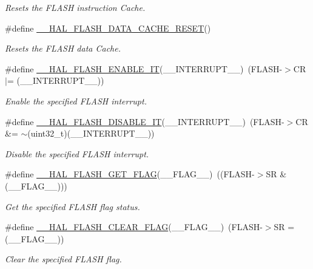 \begin{DoxyCompactItemize}
\begin{DoxyCompactList}\small\item\em Resets the F\+L\+A\+SH instruction Cache. \end{DoxyCompactList}\item 
\#define \hyperlink{group___f_l_a_s_h___exported___macros_ga3b94f4f103ddab361802c8defd3a9c34}{\+\_\+\+\_\+\+H\+A\+L\+\_\+\+F\+L\+A\+S\+H\+\_\+\+D\+A\+T\+A\+\_\+\+C\+A\+C\+H\+E\+\_\+\+R\+E\+S\+ET}()
\begin{DoxyCompactList}\small\item\em Resets the F\+L\+A\+SH data Cache. \end{DoxyCompactList}\item 
\#define \hyperlink{group___f_l_a_s_h___exported___macros_ga13fa137a911f02a2f94fb9fb0762a340}{\+\_\+\+\_\+\+H\+A\+L\+\_\+\+F\+L\+A\+S\+H\+\_\+\+E\+N\+A\+B\+L\+E\+\_\+\+IT}(\+\_\+\+\_\+\+I\+N\+T\+E\+R\+R\+U\+P\+T\+\_\+\+\_\+)~(F\+L\+A\+SH-\/$>$CR $\vert$= (\+\_\+\+\_\+\+I\+N\+T\+E\+R\+R\+U\+P\+T\+\_\+\+\_\+))
\begin{DoxyCompactList}\small\item\em Enable the specified F\+L\+A\+SH interrupt. \end{DoxyCompactList}\item 
\#define \hyperlink{group___f_l_a_s_h___exported___macros_ga1f40f507b5d4b3a4da68e4244a1097ee}{\+\_\+\+\_\+\+H\+A\+L\+\_\+\+F\+L\+A\+S\+H\+\_\+\+D\+I\+S\+A\+B\+L\+E\+\_\+\+IT}(\+\_\+\+\_\+\+I\+N\+T\+E\+R\+R\+U\+P\+T\+\_\+\+\_\+)~(F\+L\+A\+SH-\/$>$CR \&= $\sim$(uint32\+\_\+t)(\+\_\+\+\_\+\+I\+N\+T\+E\+R\+R\+U\+P\+T\+\_\+\+\_\+))
\begin{DoxyCompactList}\small\item\em Disable the specified F\+L\+A\+SH interrupt. \end{DoxyCompactList}\item 
\#define \hyperlink{group___f_l_a_s_h___exported___macros_ga0d3dd161fecc0e47c9e109c7c28672c1}{\+\_\+\+\_\+\+H\+A\+L\+\_\+\+F\+L\+A\+S\+H\+\_\+\+G\+E\+T\+\_\+\+F\+L\+AG}(\+\_\+\+\_\+\+F\+L\+A\+G\+\_\+\+\_\+)~((F\+L\+A\+SH-\/$>$SR \& (\+\_\+\+\_\+\+F\+L\+A\+G\+\_\+\+\_\+)))
\begin{DoxyCompactList}\small\item\em Get the specified F\+L\+A\+SH flag status. \end{DoxyCompactList}\item 
\#define \hyperlink{group___f_l_a_s_h___exported___macros_ga68e49c4675761e2ec35153e747de7622}{\+\_\+\+\_\+\+H\+A\+L\+\_\+\+F\+L\+A\+S\+H\+\_\+\+C\+L\+E\+A\+R\+\_\+\+F\+L\+AG}(\+\_\+\+\_\+\+F\+L\+A\+G\+\_\+\+\_\+)~(F\+L\+A\+SH-\/$>$SR = (\+\_\+\+\_\+\+F\+L\+A\+G\+\_\+\+\_\+))
\begin{DoxyCompactList}\small\item\em Clear the specified F\+L\+A\+SH flag. \end{DoxyCompactList}\end{DoxyCompactItemize}


